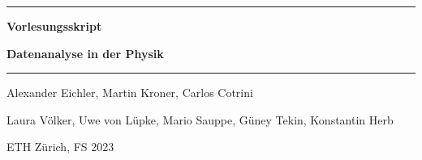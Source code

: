 \documentclass[a4paper, twoside, 11pt]{book}
\numberwithin{equation}{section} %
\numberwithin{table}{section}
\begin{document}
\hypersetup{pageanchor=false}
\begin{titlepage}
	
	
	\centering

	\hrule height 1.5pt
	\vspace{10pt}
	{\Large \bfseries Vorlesungsskript \par}
	\vspace{10pt}
	{\huge\bfseries Datenanalyse in der Physik  \par}
	\vspace{10pt}
	\hrule height 1.5pt
	
	
	\vspace{15mm}
	
	\begin{center}
		{\Large Alexander Eichler, Martin Kroner, Carlos Cotrini \par 
         \Large Laura V\"olker, Uwe von L\"upke, Mario Sauppe, G\"uney Tekin, Konstantin Herb\par }
		\vspace{15mm}
      
	
		
		
		\vfill
		{\large ETH Zürich, FS 2023\par}
	\end{center}
\end{titlepage}

\hypersetup{pageanchor=true}

\tableofcontents

\newpage
{}









\renewcommand*{\arraystretch}{1.2}%
\end{document}
